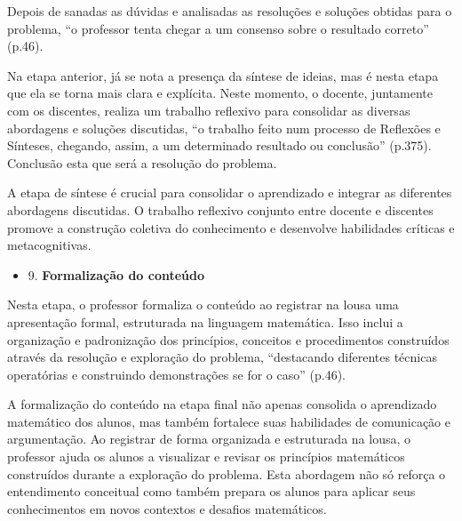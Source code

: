 Depois de sanadas as dúvidas e analisadas as resoluções e soluções obtidas para o problema, ``o professor tenta chegar a um consenso sobre o resultado correto'' \cite{resolucaoDeProblemas2019} (p.46).

Na etapa anterior, já se nota a presença da síntese de ideias, mas é nesta etapa que ela se torna mais clara e explícita. Neste momento, o docente, juntamente com os discentes, realiza um trabalho reflexivo para consolidar as diversas abordagens e soluções discutidas, ``o trabalho feito num processo de Reflexões e Sínteses, chegando, assim, a um determinado resultado ou conclusão'' \cite{ANDRADE2017} (p.375). Conclusão esta que será a resolução do problema.

A etapa de síntese é crucial para consolidar o aprendizado e integrar as diferentes abordagens discutidas. O trabalho reflexivo conjunto entre docente e discentes promove a construção coletiva do conhecimento e desenvolve habilidades críticas e metacognitivas.


\begin{itemize}
    \item 9. \textbf{Formalização do conteúdo}
\end{itemize}

Nesta etapa, o professor formaliza o conteúdo ao registrar na lousa uma apresentação formal, estruturada na linguagem matemática. Isso inclui a organização e padronização dos princípios, conceitos e procedimentos construídos através da resolução e exploração do problema, ``destacando diferentes técnicas operatórias e construindo demonstrações se for o caso'' \cite{resolucaoDeProblemas2019} (p.46).

A formalização do conteúdo na etapa final não apenas consolida o aprendizado matemático dos alunos, mas também fortalece suas habilidades de comunicação e argumentação. Ao registrar de forma organizada e estruturada na lousa, o professor ajuda os alunos a visualizar e revisar os princípios matemáticos construídos durante a exploração do problema. Esta abordagem não só reforça o entendimento conceitual como também prepara os alunos para aplicar seus conhecimentos em novos contextos e desafios matemáticos.


